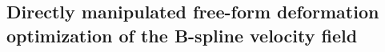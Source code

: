 \documentclass{llncs}
\begin{document}

\subsection{Directly manipulated free-form deformation optimization of the B-spline velocity field}
\end{document}
